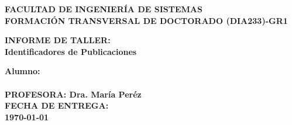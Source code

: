 \pagestyle{empty}
\begin{titlepage}
  \begin{center}
    \noindent \huge \textbf{FACULTAD DE INGENIERÍA DE SISTEMAS}\\ \vspace{2.cm}
    \noindent \huge \textbf{FORMACIÓN TRANSVERSAL DE DOCTORADO (DIA233)-GR1}\\ \vspace{2.cm}
    

  \end{center}

  \begin{center}
    \noindent \huge{\textbf{INFORME DE TALLER: \\Identificadores de Publicaciones}}

  \end{center}

  \vspace{0.5cm}

  \begin{center}
    \noindent \huge{\textbf{Alumno:}}\\
    \\
    \vspace{ 2.0cm}
    \noindent \huge{ \textbf{PROFESORA: Dra. María Peréz}}\\
    \vspace{2.cm}
    \noindent \huge{ \textbf{FECHA DE ENTREGA: \\ \vspace{0.5cm}\today}}
  \end{center}
  \newpage
  \cleardoublepage
\end{titlepage}
